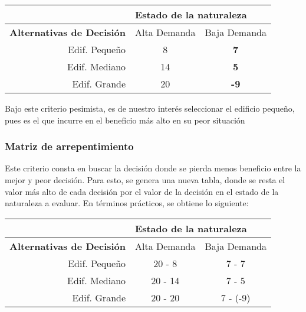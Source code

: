 \begin{table}[H]
    \begin{tabular}{r|cc|}
        \cline{2-3}
        \multicolumn{1}{l|}{}                                   & \multicolumn{2}{l|}{\textbf{Estado de la naturaleza}}                                     \\ \hline
        \multicolumn{1}{|l|}{\textbf{Alternativas de Decisión}} & \multicolumn{1}{l|}{Alta Demanda}                     & \multicolumn{1}{l|}{Baja Demanda} \\ \hline
        \multicolumn{1}{|r|}{Edif. Pequeño}                     & \multicolumn{1}{c|}{8}                                & {\color[HTML]{FE0000} \textbf{7}} \\
        \multicolumn{1}{|r|}{Edif. Mediano}                     & \multicolumn{1}{c|}{14}                               & \textbf{5}                        \\
        \multicolumn{1}{|r|}{Edif. Grande}                      & \multicolumn{1}{c|}{{\color[HTML]{333333} 20}}        & \textbf{-9}                       \\ \hline
    \end{tabular}
\end{table}

Bajo este criterio pesimista, es de nuestro interés seleccionar el edificio pequeño, pues es el que incurre en el beneficio más alto en su peor situación

\subsubsection{Matriz de arrepentimiento}
Este criterio consta en buscar la decisión donde se pierda menos beneficio entre la mejor y peor decisión. Para esto, se genera una nueva tabla, donde se resta el valor más alto de cada decisión por el valor de la decisión en el estado de la naturaleza a evaluar. En términos prácticos, se obtiene lo siguiente:

\begin{table}[H]
    \begin{tabular}{r|cc|}
        \cline{2-3}
        \multicolumn{1}{l|}{}                                   & \multicolumn{2}{l|}{\textbf{Estado de la naturaleza}}                                     \\ \hline
        \multicolumn{1}{|l|}{\textbf{Alternativas de Decisión}} & \multicolumn{1}{l|}{Alta Demanda}                     & \multicolumn{1}{l|}{Baja Demanda} \\ \hline
        \multicolumn{1}{|r|}{Edif. Pequeño}                     & \multicolumn{1}{c|}{20 - 8}                           & {\color[HTML]{333333} 7 - 7}      \\
        \multicolumn{1}{|r|}{Edif. Mediano}                     & \multicolumn{1}{c|}{20 - 14}                          & 7 - 5                             \\
        \multicolumn{1}{|r|}{Edif. Grande}                      & \multicolumn{1}{c|}{{\color[HTML]{333333} 20 - 20}}   & 7 - (-9)                          \\ \hline
    \end{tabular}
\end{table}

